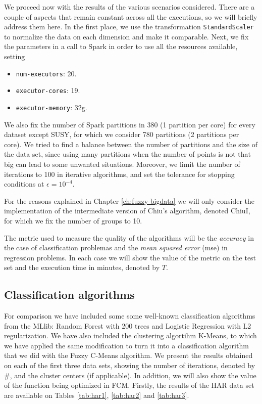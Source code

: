 We proceed now with the results of the various scenarios considered. There are a couple of aspects that remain constant across all the executions, so we will briefly address them here. In the first place, we use the transformation \verb|StandardScaler| to normalize the data on each dimension and make it comparable. Next, we fix the parameters in a call to Spark in order to use all the resources available, setting

\begin{itemize}
  \item \verb|num-executors|: 20.
  \item \verb|executor-cores|: 19.
  \item \verb|executor-memory|: 32g.
\end{itemize}
We also fix the number of Spark partitions in 380 (1 partition per core) for every dataset except SUSY, for which we consider 780 partitions (2 partitions per core). We tried to find a balance between the number of partitions and the size of the data set, since using many partitions when the number of points is not that big can lead to some unwanted situations. Moreover, we limit the number of iterations to 100 in iterative algorithms, and set the tolerance for stopping conditions at $\epsilon=10^{-4}$.

For the reasons explained in Chapter \ref{ch:fuzzy-bigdata} we will only consider the implementation of the intermediate version of Chiu's algorithm, denoted ChiuI, for which we fix the number of groups to 10.

The metric used to measure the quality of the algorithms will be the \textit{accuracy} in the case of classification problemas and the \textit{mean squared error} (\acrshort{mse}) in regression problems. In each case we will show the value of the metric on the test set and the execution time in minutes, denoted by $T$.

\subsection{Classification algorithms}

For comparison we have included some some well-known classification algorithms from the MLlib: Random Forest with 200 trees and Logistic Regression with L2 regularization. We have also included the clustering algortihm K-Means, to which we have applied the same modification to turn it into a classification algorithm that we did with the Fuzzy C-Means algorithm. We present the results obtained on each of the first three data sets, showing the number of iterations, denoted by \#, and the cluster centers (if applicable). In addition, we will also show the value of the function being optimized in FCM. Firstly, the results of the HAR data set are available on Tables \ref{tab:har1}, \ref{tab:har2} and \ref{tab:har3}.

